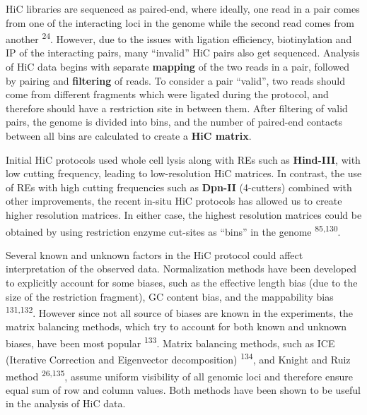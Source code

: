 \documentclass[11pt,twoside]{MPIthesis}
\theoremstyle{definition}
\theoremstyle{definition}
\theoremstyle{definition}
\theoremstyle{remark}
\begin{document}
HiC libraries are sequenced as paired-end, where ideally, one read in a
pair comes from one of the interacting loci in the genome while the
second read comes from another \textsuperscript{24}. However, due to the
issues with ligation efficiency, biotinylation and IP of the interacting
pairs, many ``invalid'' HiC pairs also get sequenced. Analysis of HiC
data begins with separate \textbf{mapping} of the two reads in a pair,
followed by pairing and \textbf{filtering} of reads. To consider a pair
``valid'', two reads should come from different fragments which were
ligated during the protocol, and therefore should have a restriction
site in between them. After filtering of valid pairs, the genome is
divided into bins, and the number of paired-end contacts between all
bins are calculated to create a \textbf{HiC matrix}.

Initial HiC protocols used whole cell lysis along with REs such as
\textbf{Hind-III}, with low cutting frequency, leading to low-resolution
HiC matrices. In contrast, the use of REs with high cutting frequencies
such as \textbf{Dpn-II} (4-cutters) combined with other improvements,
the recent in-situ HiC protocols has allowed us to create higher
resolution matrices. In either case, the highest resolution matrices
could be obtained by using restriction enzyme cut-sites as ``bins'' in
the genome \textsuperscript{85,130}.

Several known and unknown factors in the HiC protocol could affect
interpretation of the observed data. Normalization methods have been
developed to explicitly account for some biases, such as the effective
length bias (due to the size of the restriction fragment), GC content
bias, and the mappability bias \textsuperscript{131,132}. However since
not all source of biases are known in the experiments, the matrix
balancing methods, which try to account for both known and unknown
biases, have been most popular \textsuperscript{133}. Matrix balancing
methods, such as ICE (Iterative Correction and Eigenvector
decomposition) \textsuperscript{134}, and Knight and Ruiz method
\textsuperscript{26,135}, assume uniform visibility of all genomic loci
and therefore ensure equal sum of row and column values. Both methods
have been shown to be useful in the analysis of HiC data.
\end{document}
